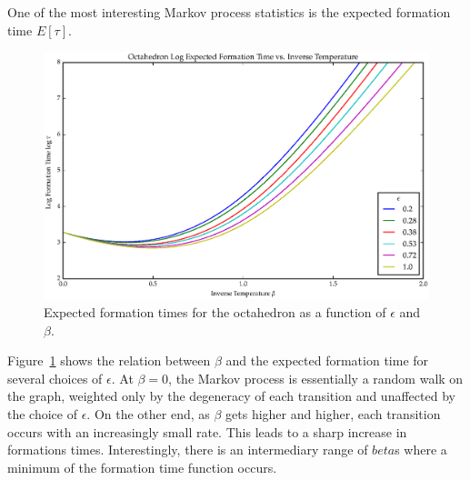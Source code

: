 One of the most interesting Markov process statistics is the expected formation time $E[\tau]$.
\begin{figure}[ht]
\label{fig:OctaTau}
\centering
  \includegraphics[scale=0.6]{images/octahedron_tau.eps}
\caption{Expected formation times for the octahedron as a function of $\epsilon$ and $\beta$.}
\end{figure}
Figure~\ref{fig:OctaTau} shows the relation between $\beta$ and the expected formation time for several choices of $\epsilon$. At $\beta = 0$, the Markov process is essentially a random walk on the graph, weighted only by the degeneracy of each transition and unaffected by the choice of $\epsilon$. On the other end, as $\beta$ gets higher and higher, each transition occurs with an increasingly small rate. This leads to a sharp increase in formations times. Interestingly, there is an intermediary range of $beta$s where a minimum of the formation time function occurs. 
